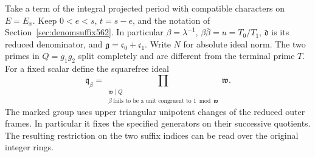 \documentclass[a4paper,11pt]{article}
\theoremstyle{definition}
\theoremstyle{remark}
\numberwithin{equation}{section}
\begin{document}
Take a term of the integral projected period with compatible
characters on \(E=E_x\). Keep \(0<e<s\), \(t=s-e\), and the
notation of Section~\ref{sec:denomsuffix562}. In particular
\(\beta=\lambda^{-1}\), \(\beta\bar\beta=u=T_0/T_1\),
\(\mathfrak d\) is its reduced denominator, and
\(\mathfrak g=\mathfrak c_0+\mathfrak c_1\). Write \(N\) for
absolute ideal norm. The two primes in \(Q=g_1g_2\) split
completely and are different from the terminal prime \(T\).
For a fixed scalar define the squarefree ideal
\[
   \mathfrak q_\beta=
   \prod_{\substack{\mathfrak w\mid Q\\
           \beta\ \text{fails to be a unit congruent to }1
                         \bmod\mathfrak w}}\mathfrak w .
\]
The marked group uses upper triangular unipotent changes of the
reduced outer frames. In particular it fixes the specified
generators on their successive quotients. The resulting restriction
on the two suffix indices can be read over the original integer rings.
\end{document}

